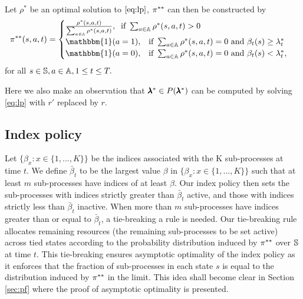 Let $\rho^{*}$ be an optimal solution to $\eqref{eq:lp}$, $\pi^{**}$ can then be constructed by
\begin{equation}\label{df:rho}
\subp^{**}(s,a,t)=
\begin{cases}
\frac{\rho^*(s,a,t)}{\sum_{a\in\subactions}\rho^*(s,a,t)},\; \; \text{if }\sum_{a\in\subactions}\rho^*(s,a,t)>0\\
\mathbbm{1}(a=1), \;\;\;\text{if }\sum_{a\in\subactions}\rho^*(s,a,t)=0 \text{ and }\beta_t(s) \geq \lambda^*_t\\
\mathbbm{1}(a=0), \;\;\;\text{if }\sum_{a\in\subactions}\rho^*(s,a,t)=0 \text{ and }\beta_t(s)< \lambda^*_t,
\end{cases}
\end{equation}for all $s\in \mathbb{S},a\in\mathbb{A},1\leq t\leq T.$


Here we also make an observation that $\pmb{\lambda}^*\in P(\pmb{\lambda}^*)$ can be computed by solving \eqref{eq:lp} with $r'$ replaced by $r$. 
\subsection{Index policy}
Let $\{\beta_x:x\in\{1,...,K\}\}$ be the indices associated with the K sub-processes at time $t$. 
We define $\bar{\beta}_t$ to be the largest value $\beta$ in $\{\beta_x:x\in\{1,...,K\}\}$ such that at least $m$ sub-processes have indices of at least $\beta$. Our index policy then sets the sub-processes with indices strictly greater than $\bar{\beta}_t$ active, and those with indices strictly less than $\bar{\beta}_t$ inactive. 
When more than $m$ sub-processes have indices greater than or equal to $\bar{\beta}_t$, a tie-breaking a rule is needed.
Our tie-breaking rule allocates remaining resources (the remaining sub-processes to be set active) across tied states according to the probability distribution induced by $\pi^{**}$ over $\mathbb{S}$ at time $t$. 
This tie-breaking ensures asymptotic optimality of the index policy as it enforces that the fraction of sub-processes in each state $s$ is equal to the distribution induced by $\pi^{**}$ in the limit. 
This idea shall become clear in Section \ref{sec:pf} where the proof of asymptotic optimality is presented.

